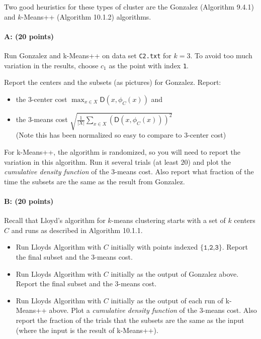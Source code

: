 \documentclass[11pt]{article}
\newcommand{\D}{\textsf{D}}
\begin{document}
Two good heuristics for these types of cluster are the 
\textsf{Gonzalez} (Algorithm 9.4.1) and \textsf{$k$-Means++} (Algorithm 10.1.2) algorithms.  

\paragraph{A: (20 points)}
Run \textsf{Gonzalez} and \textsf{k-Means++} on data set \texttt{C2.txt} for $k=3$. 
To avoid too much variation in the results, choose $c_1$ as the point with index \texttt{1}.  

Report the centers and the subsets (as pictures) for \textsf{Gonzalez}.  Report:
\begin{itemize} \denselist
\item the $3$-center cost $\max_{x \in X} \D(x,\phi_C(x))$  and 
\item the $3$-means cost $\sqrt{\frac{1}{|X|}\sum_{x \in X} (\D(x,\phi_C(x)))^2}$
  \\ (Note this has been normalized so easy to compare to $3$-center cost)
\end{itemize}


For \textsf{k-Means++}, the algorithm is randomized, so you will need to report the variation in this algorithm.  Run it several trials (at least $20$) and plot the \emph{cumulative density function} of the $3$-means cost.  
Also report what fraction of the time the subsets are the same as the result from \textsf{Gonzalez}.  


\paragraph{B: (20 points)}
Recall that Lloyd's algorithm for $k$-means clustering starts with a set of $k$ centers $C$ and runs as described in Algorithm 10.1.1.  

\begin{itemize}
\item  Run Lloyds Algorithm with $C$ initially with points indexed $\{\texttt{1,2,3}\}$.  Report the final subset and the $3$-means cost.  
\item  Run Lloyds Algorithm with $C$ initially as the output of \textsf{Gonzalez} above.  Report the final subset and the $3$-means cost.  
\item  Run Lloyds Algorithm with $C$ initially as the output of each run of \textsf{k-Means++} above.  Plot a \emph{cumulative density function} of the $3$-means cost.  Also report the fraction of the trials that the subsets are the same as the input (where the input is the result of \textsf{k-Means++}).  
\end{itemize}
\end{document}
